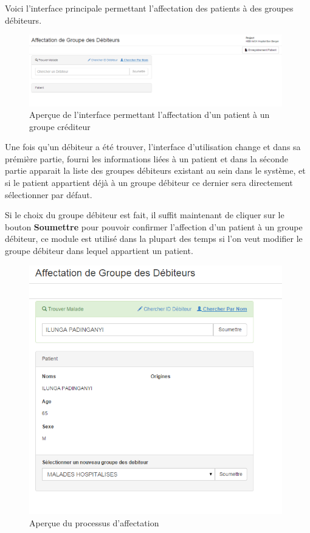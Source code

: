 \documentclass[12pt,a4paper]{report}
\begin{document}
Voici l'interface principale permettant l'affectation des patients à des groupes débiteurs.

\begin{figure}[h]
\begin{center}
\includegraphics[width=11cm]{pic/AffeGrDeb.png}
\end{center}
\caption{Aperçue de l'interface permettant l'affectation d'un patient à un groupe créditeur}
\label{Aperçue de l'interface permettant l'affectation d'un patient à un groupe créditeur}
\end{figure}

\newpage
Une fois qu'un débiteur a été trouver, l'interface d'utilisation change et dans sa prémière partie, fourni les informations liées à un patient et dans la séconde partie apparait la liste des groupes débiteurs existant au sein dans le système, et si le patient appartient déjà à un groupe débiteur ce dernier sera directement sélectionner par défaut.

Si le choix du groupe débiteur est fait, il suffit maintenant de cliquer sur le bouton \textbf{Soumettre} pour pouvoir confirmer l'affection d'un patient à un groupe débiteur, ce module est utilisé dans la plupart des temps si l'on veut modifier le groupe débiteur dans lequel appartient un patient.

\begin{figure}[h]
\begin{center}
\includegraphics[width=11cm]{pic/AffectGrDebiteur.png}
\end{center}
\caption{Aperçue du processus d'affectation}
\label{Aperçue du processus d'affectation}
\end{figure}
\end{document}
